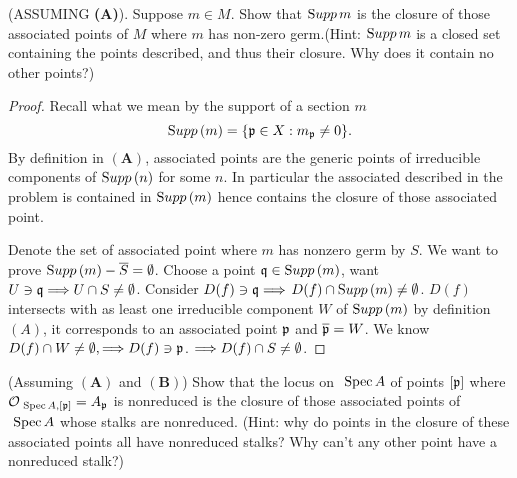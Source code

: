\documentclass[11pt]{book} %
\begin{document}
\begin{exr}
(ASSUMING \textbf{(A)}). Suppose $m \in M$. Show that ${\text Supp\thinspace} m$ is the closure of those associated points of $M$ where $m$ has non-zero germ.(Hint: ${\text Supp\thinspace} m$ is a closed set containing the points described, and thus their closure. Why does it contain no other points?)
\end{exr}
\begin{proof}
Recall what we mean by the support of a section $m$
$$
{\text Supp\thinspace}(m)=\{{\mathfrak p}\in X:m_{{\mathfrak p}}\neq 0\}.
$$
By definition in $\mathbf{(A)}$, associated points are the generic points of irreducible components of ${\text Supp\thinspace}(n)$ for some $n$. In particular the associated described in the problem is contained in ${\text Supp\thinspace}(m)$ hence contains the closure of those associated point.

Denote the set of associated point where $m$ has nonzero germ by $S$. We want to prove ${\text Supp\thinspace}(m)-\overline{S}=\emptyset$. Choose a point $\mathfrak q\in {\text Supp\thinspace}(m)$, want $U\ni\mathfrak q\Longrightarrow U\cap S\neq \emptyset$. Consider $D(f)\ni \mathfrak q\Longrightarrow$ $D(f)\cap {\text Supp\thinspace}(m)\neq \emptyset$. $D(f)$ intersects with as least one irreducible component $W$ of ${\text Supp\thinspace}(m)$ by definition $(A)$, it corresponds to an associated point ${\mathfrak p}$ and $\overline{{\mathfrak p}}=W$. We know $D(f)\cap W\neq \emptyset,\Longrightarrow D(f)\ni {\mathfrak p}$. $\Longrightarrow D(f)\cap S\neq \emptyset$.
\end{proof}
\begin{exr}(Assuming $\mathbf{(A)}$ and $\mathbf{(B)}$)
Show that the locus on $\text{ Spec\,} A$ of points $[{\mathfrak p}]$ where ${\cal O}_{\text{ Spec\,} A,[{\mathfrak p}]} = A_{\mathfrak p}$ is nonreduced is the closure of those associated points of $\text{ Spec\,} A$ whose stalks are nonreduced. (Hint: why do points in the closure of these associated points all have nonreduced stalks? Why can’t any other point have a nonreduced stalk?)
\end{exr}
\end{document}
